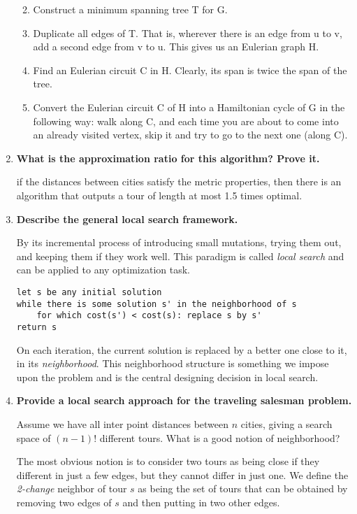 \documentclass[a4paper,11pt]{article}
\begin{document}
\begin{enumerate}
  \begin{enumerate}
  \def\labelenumii{\arabic{enumii}.}
  \itemsep1pt\parskip0pt
  \item
    Construct a minimum spanning tree T for G.
  \item
    Duplicate all edges of T. That is, wherever there is an edge from u
    to v, add a second edge from v to u. This gives us an Eulerian graph
    H.
  \item
    Find an Eulerian circuit C in H. Clearly, its span is twice the span
    of the tree.
  \item
    Convert the Eulerian circuit C of H into a Hamiltonian cycle of G in
    the following way: walk along C, and each time you are about to come
    into an already visited vertex, skip it and try to go to the next
    one (along C).
  \end{enumerate}
\item
  \textbf{What is the approximation ratio for this algorithm? Prove it.}

  if the distances between cities satisfy the metric properties, then
  there is an algorithm that outputs a tour of length at most 1.5 times
  optimal.
\item
  \textbf{Describe the general local search framework.}

  By its incremental process of introducing small mutations, trying them
  out, and keeping them if they work well. This paradigm is called
  \emph{local search} and can be applied to any optimization task.

\begin{verbatim}
let s be any initial solution
while there is some solution s' in the neighborhood of s
    for which cost(s') < cost(s): replace s by s'
return s
\end{verbatim}

  On each iteration, the current solution is replaced by a better one
  close to it, in its \emph{neighborhood}. This neighborhood structure
  is something we impose upon the problem and is the central designing
  decision in local search.
\item
  \textbf{Provide a local search approach for the traveling salesman
  problem.}

  Assume we have all inter point distances between $n$ cities, giving a
  search space of $(n - 1)!$ different tours. What is a good notion of
  neighborhood?

  The most obvious notion is to consider two tours as being close if
  they different in just a few edges, but they cannot differ in just
  one. We define the \emph{2-change} neighbor of tour $s$ as being the
  set of tours that can be obtained by removing two edges of $s$ and
  then putting in two other edges.


\end{enumerate}
\end{document}
